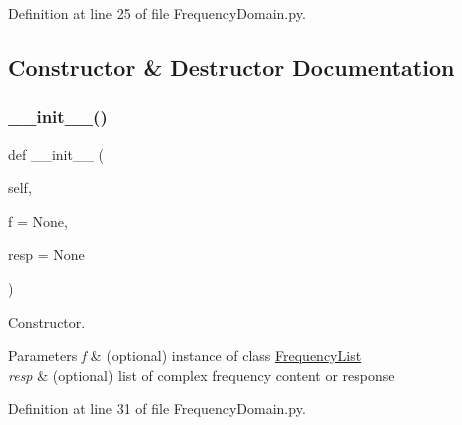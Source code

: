 Definition at line 25 of file Frequency\+Domain.\+py.



\subsection{Constructor \& Destructor Documentation}
\mbox{\label{classSignalIntegrity_1_1FrequencyDomain_1_1FrequencyDomain_1_1FrequencyDomain_af89c1b84b55a8388acf19c91be67a97e}} 
\subsubsection{\texorpdfstring{\+\_\+\+\_\+init\+\_\+\+\_\+()}{\_\_init\_\_()}}
{\footnotesize\ttfamily def \+\_\+\+\_\+init\+\_\+\+\_\+ (\begin{DoxyParamCaption}\item[{}]{self,  }\item[{}]{f = {\ttfamily None},  }\item[{}]{resp = {\ttfamily None} }\end{DoxyParamCaption})}



Constructor. 


\begin{DoxyParams}{Parameters}
{\em f} & (optional) instance of class \hyperlink{namespaceSignalIntegrity_1_1FrequencyDomain_1_1FrequencyList}{Frequency\+List} \\
\hline
{\em resp} & (optional) list of complex frequency content or response \\
\hline
\end{DoxyParams}


Definition at line 31 of file Frequency\+Domain.\+py.



